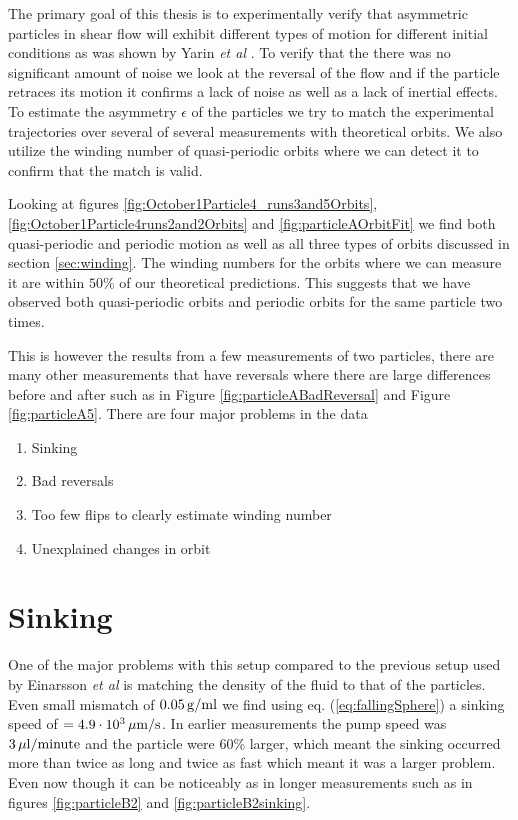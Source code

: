 The primary goal of this thesis is to experimentally verify that asymmetric particles in shear flow will exhibit different types of motion for different initial conditions as was shown by Yarin \emph{et al} \cite{Yarin}. To verify that the there was no significant amount of noise we look at the reversal of the flow and if the particle retraces its motion it confirms a lack of noise as well as a lack of inertial effects. To estimate the asymmetry $\epsilon$ of the particles we try to match the experimental trajectories over several of several measurements with theoretical orbits. We also utilize the winding number of quasi-periodic orbits where we can detect it to confirm that the match is valid.

Looking at figures \ref{fig:October1Particle4_runs3and5Orbits}, \ref{fig:October1Particle4runs2and2Orbits} and \ref{fig:particleAOrbitFit} we find both quasi-periodic and periodic motion as well as all three types of orbits discussed in section \ref{sec:winding}. The winding numbers for the orbits where we can measure it are within $50\%$ of our theoretical predictions. This suggests that we have observed both quasi-periodic orbits and periodic orbits for the same particle two times. 

This is however the results from a few measurements of two particles, there are many other measurements that have reversals where there are large differences before and after such as in Figure \ref{fig:particleABadReversal} and Figure \ref{fig:particleA5}. There are four major problems in the data 

\begin{enumerate}
\item Sinking
\item Bad reversals
\item Too few flips to clearly estimate winding number
\item Unexplained changes in orbit
\end{enumerate}

\section{Sinking}
One of the major problems with this setup compared to the previous setup used by Einarsson \emph{et al} \cite{JonasExperiment} is matching the density of the fluid to that of the particles. Even small mismatch of $\unit[0.05]{g/ml}$ we find using eq. (\ref{eq:fallingSphere}) a sinking speed of $= \unit[4.9\cdot10^3 ]{\mu m/s}$. In earlier measurements the pump speed was $\unit[3]{\mu l/minute}$ and the particle were 60\% larger, which meant the sinking occurred more than twice as long and twice as fast which meant it was a larger problem. Even now though it can be noticeably as in longer measurements such as in figures \ref{fig:particleB2} and \ref{fig:particleB2sinking}.

